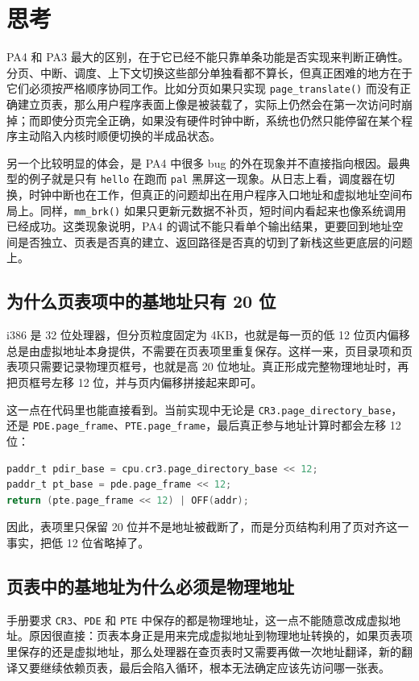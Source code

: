 \documentclass[a4paper]{article}
\begin{document}
\section{思考}
PA4 和 PA3 最大的区别，在于它已经不能只靠单条功能是否实现来判断正确性。分页、中断、调度、上下文切换这些部分单独看都不算长，但真正困难的地方在于它们必须按严格顺序协同工作。比如分页如果只实现 \texttt{page\_translate()} 而没有正确建立页表，那么用户程序表面上像是被装载了，实际上仍然会在第一次访问时崩掉；而即使分页完全正确，如果没有硬件时钟中断，系统也仍然只能停留在某个程序主动陷入内核时顺便切换的半成品状态。

另一个比较明显的体会，是 PA4 中很多 bug 的外在现象并不直接指向根因。最典型的例子就是只有 \texttt{hello} 在跑而 \texttt{pal} 黑屏这一现象。从日志上看，调度器在切换，时钟中断也在工作，但真正的问题却出在用户程序入口地址和虚拟地址空间布局上。同样，\texttt{mm\_brk()} 如果只更新元数据不补页，短时间内看起来也像系统调用已经成功。这类现象说明，PA4 的调试不能只看单个输出结果，更要回到地址空间是否独立、页表是否真的建立、返回路径是否真的切到了新栈这些更底层的问题上。

\subsection{为什么页表项中的基地址只有 20 位}
i386 是 32 位处理器，但分页粒度固定为 4KB，也就是每一页的低 12 位页内偏移总是由虚拟地址本身提供，不需要在页表项里重复保存。这样一来，页目录项和页表项只需要记录物理页框号，也就是高 20 位地址。真正形成完整物理地址时，再把页框号左移 12 位，并与页内偏移拼接起来即可。

这一点在代码里也能直接看到。当前实现中无论是 \texttt{CR3.page\_directory\_base}，还是 \texttt{PDE.page\_frame}、\texttt{PTE.page\_frame}，最后真正参与地址计算时都会左移 12 位：
\begin{lstlisting}[language=C]
paddr_t pdir_base = cpu.cr3.page_directory_base << 12;
paddr_t pt_base = pde.page_frame << 12;
return (pte.page_frame << 12) | OFF(addr);
\end{lstlisting}
因此，表项里只保留 20 位并不是地址被截断了，而是分页结构利用了页对齐这一事实，把低 12 位省略掉了。

\subsection{页表中的基地址为什么必须是物理地址}
手册要求 \texttt{CR3}、\texttt{PDE} 和 \texttt{PTE} 中保存的都是物理地址，这一点不能随意改成虚拟地址。原因很直接：页表本身正是用来完成虚拟地址到物理地址转换的，如果页表项里保存的还是虚拟地址，那么处理器在查页表时又需要再做一次地址翻译，新的翻译又要继续依赖页表，最后会陷入循环，根本无法确定应该先访问哪一张表。
\end{document}
